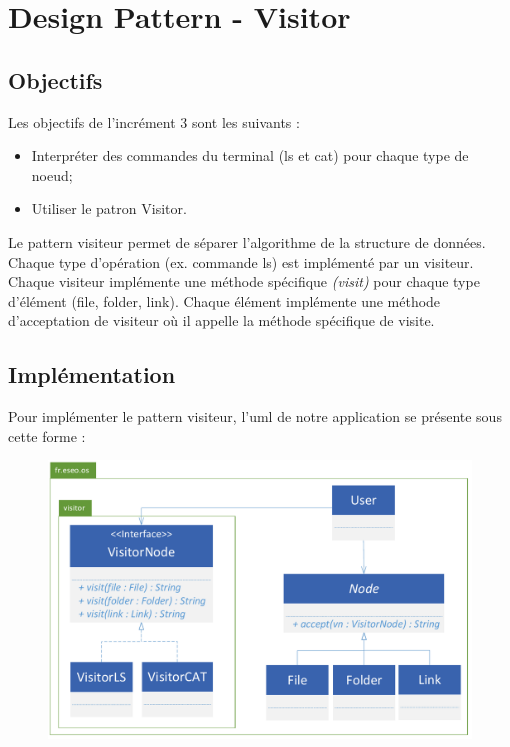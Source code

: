 \newpage
\section{Design Pattern - Visitor}

\subsection{Objectifs}

Les objectifs de l'incrément 3 sont les suivants :\\
\begin{itemize}
\item Interpréter des commandes du terminal (ls et cat) pour chaque type de noeud;
\item Utiliser le patron Visitor.\\
\end{itemize}

Le pattern visiteur permet de séparer l'algorithme de la structure de données.
Chaque type d'opération (ex. commande ls) est implémenté par un visiteur. Chaque visiteur implémente une méthode spécifique \emph{(visit)} pour chaque type d'élément (file, folder, link). Chaque élément implémente une méthode d'acceptation de visiteur où il appelle la méthode spécifique de visite.


\subsection{Implémentation}

Pour implémenter le pattern visiteur, l'uml de notre application se présente sous cette forme :\\


\begin{figure}[!h]
\centering
\includegraphics[width=\textwidth]{../uml/uml-visitor}
\end{figure}	


